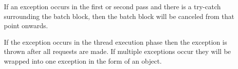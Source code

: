 \documentclass[12pt, letterpaper]{article}
\begin{document}
If an exception occurs in the first or second pass and there is a try-catch surrounding the batch block, then the batch block will be canceled from that point onwards.

If the exception occurs in the thread execution phase then the exception is thrown after all requests are made. If multiple exceptions occur they will be wrapped into one exception in the form of an object.

\end{document}
